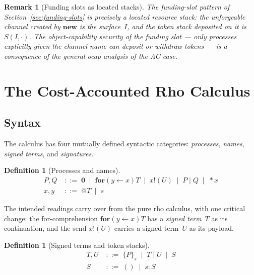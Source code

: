 \documentclass[11pt,a4paper]{article}
\makeatletter
\newtheorem{definition}[theorem]{Definition}
\newtheorem{remark}[theorem]{Remark}
\newcommand{\Par}{\mathbin{|}}
\newcommand{\forc}{\mathbf{for}}
\newcommand{\send}[2]{#1 !\!\left( #2 \right)}
\newcommand{\recv}[3]{\forc\!\left( #1 \leftarrow #2 \right) #3}
\newcommand{\nil}{\mathbf{0}}
\newcommand{\drop}[1]{{\ast} #1}
\newcommand{\quot}[1]{@#1}
\newcommand{\signed}[2]{\{#1\}_{#2}}
\makeatother
\begin{document}
\begin{remark}[Funding slots as located stacks]
  The funding-slot pattern of Section~\ref{sec:funding-slots} is
  precisely a located resource stack: the unforgeable channel
  created by $\mathbf{new}$ is the surface~$I$, and the token
  stack deposited on it is $S(I, \cdot)$.  The
  object-capability security of the funding slot --- only
  processes explicitly given the channel name can deposit or
  withdraw tokens --- is a consequence of the general
  ocap analysis of the AC case.
\end{remark}

\section{The Cost-Accounted Rho Calculus}
\label{sec:calculus}

\subsection{Syntax}
\label{sec:syntax}

The calculus has four mutually defined syntactic categories:
\emph{processes}, \emph{names}, \emph{signed terms}, and
\emph{signatures}.

\begin{definition}[Processes and names]
  \label{def:proc-name}
  \begin{align}
    P, Q &\;::=\; \nil
          \;\mid\; \recv{y}{x}{T}
          \;\mid\; \send{x}{U}
          \;\mid\; P \Par Q
          \;\mid\; \drop{x}
    \label{eq:proc-syntax}
    \\[4pt]
    x, y &\;::=\; \quot{T} \;\mid\; s
    \label{eq:name-syntax}
  \end{align}
\end{definition}

\noindent
The intended readings carry over from the pure rho calculus,
with one critical change: the for-comprehension
$\recv{y}{x}{T}$ has a \emph{signed term}~$T$ as its
continuation, and the send $\send{x}{U}$ carries a signed
term~$U$ as its payload.

\begin{definition}[Signed terms and token stacks]
  \label{def:signed-term}
  \begin{align}
    T, U &\;::=\; \signed{P}{s}
          \;\mid\; T \Par U
          \;\mid\; S
    \label{eq:signed-term-syntax}
    \\[4pt]
    S &\;::=\; ()
       \;\mid\; s : S
    \label{eq:token-syntax}
  \end{align}
\end{definition}
\end{document}
